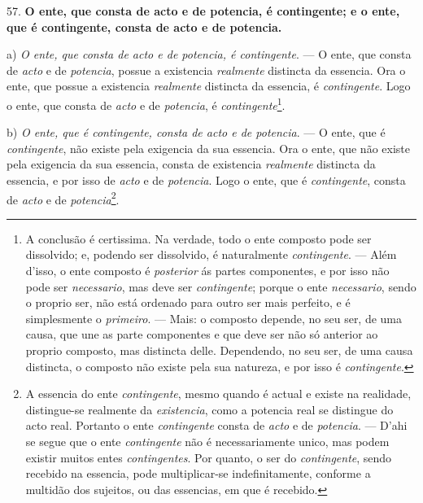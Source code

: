 57. \textbf{O ente, que consta de acto e de potencia, é contingente; e o ente, que é contingente, consta de acto e de potencia.}

a) \emph{O ente, que consta de acto e de potencia, é contingente}. --- O ente, que consta de \emph{acto} e de \emph{potencia}, possue a existencia \emph{realmente} distincta da essencia. Ora o ente, que possue a existencia \emph{realmente} distincta da essencia, é \emph{contingente}. Logo o ente, que consta de \emph{acto} e de \emph{potencia}, é \emph{contingente}\footnote{A conclusão é certissima. Na verdade, todo o ente composto pode ser dissolvido; e, podendo ser dissolvido, é naturalmente \emph{contingente}. --- Além d'isso, o ente composto é \emph{posterior} ás partes componentes, e por isso não pode ser \emph{necessario}, mas deve ser \emph{contingente}; porque o ente \emph{necessario}, sendo o proprio ser, não está ordenado para outro ser mais perfeito, e é simplesmente o \emph{primeiro}. --- Mais: o composto depende, no seu ser, de uma causa, que une as parte componentes e que deve ser não só anterior ao proprio composto, mas distincta delle. Dependendo, no seu ser, de uma causa distincta, o composto não existe pela sua natureza, e por isso é \emph{contingente}.}.


b) \emph{O ente, que é contingente, consta de acto e de potencia}. --- O ente, que é \emph{contingente}, não existe pela exigencia da sua essencia. Ora o ente, que não existe pela exigencia da sua essencia, consta de existencia \emph{realmente} distincta da essencia, e por isso de \emph{acto} e de \emph{potencia}. Logo o ente, que é \emph{contingente}, consta de \emph{acto} e de \emph{potencia}\footnote{A essencia do ente \emph{contingente}, mesmo quando é actual e existe na realidade, distingue-se realmente da \emph{existencia}, como a potencia real se distingue do acto real. Portanto o ente \emph{contingente} consta de \emph{acto} e de \emph{potencia}. --- D'ahi se segue que o ente \emph{contingente} não é necessariamente unico, mas podem existir muitos entes \emph{contingentes}. Por quanto, o ser do \emph{contingente}, sendo recebido na essencia, pode multiplicar-se indefinitamente, conforme a multidão dos sujeitos, ou das essencias, em que é recebido.}.

